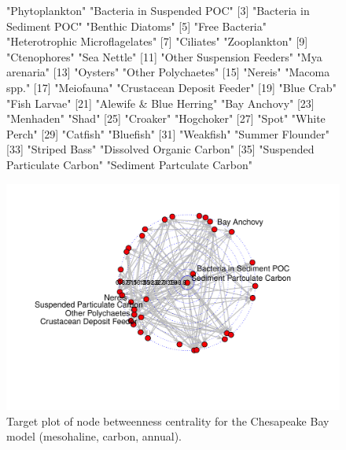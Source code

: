 \documentclass[article]{jss}
\begin{document}
\begin{figure}[!htbp]
  \center
\begin{Schunk}
\begin{Soutput}
 [1] "Phytoplankton"                 "Bacteria in Suspended POC"    
 [3] "Bacteria in Sediment POC"      "Benthic Diatoms"              
 [5] "Free Bacteria"                 "Heterotrophic Microflagelates"
 [7] "Ciliates"                      "Zooplankton"                  
 [9] "Ctenophores"                   "Sea Nettle"                   
[11] "Other Suspension Feeders"      "Mya arenaria"                 
[13] "Oysters"                       "Other Polychaetes"            
[15] "Nereis"                        "Macoma spp."                  
[17] "Meiofauna"                     "Crustacean Deposit Feeder"    
[19] "Blue Crab"                     "Fish Larvae"                  
[21] "Alewife & Blue Herring"        "Bay Anchovy"                  
[23] "Menhaden"                      "Shad"                         
[25] "Croaker"                       "Hogchoker"                    
[27] "Spot"                          "White Perch"                  
[29] "Catfish"                       "Bluefish"                     
[31] "Weakfish"                      "Summer Flounder"              
[33] "Striped Bass"                  "Dissolved Organic Carbon"     
[35] "Suspended Particulate Carbon"  "Sediment Partculate Carbon"   
\end{Soutput}
\end{Schunk}
\includegraphics{enaR-vignette-050}
\caption{Target plot of node betweenness centrality for the Chesapeake
  Bay model (mesohaline, carbon, annual).} \label{fig:target}
\end{figure}
\end{document}
